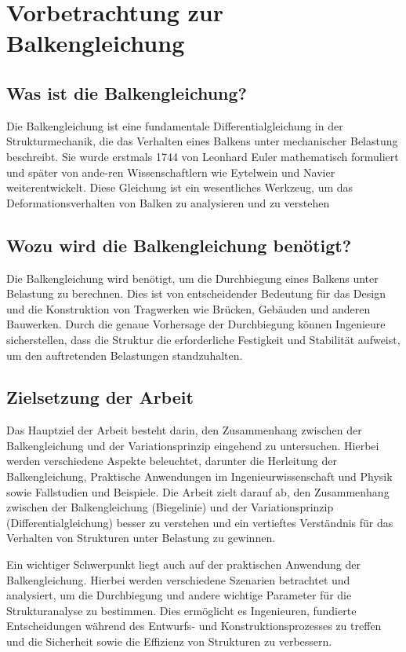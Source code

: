 %
%
%
%
\section{Vorbetrachtung zur Balkengleichung\label{balken:section:teil0}}
\subsection{Was ist die Balkengleichung?}
Die Balkengleichung ist eine fundamentale Differentialgleichung in der Strukturmechanik, die das Verhalten eines Balkens unter mechanischer Belastung beschreibt. 
Sie wurde erstmals 1744 von Leonhard Euler mathematisch formuliert und später von ande-ren Wissenschaftlern wie Eytelwein und Navier weiterentwickelt. 
Diese Gleichung ist ein wesentliches Werkzeug, um das Deformationsverhalten von Balken zu analysieren und zu verstehen
\subsection{Wozu wird die Balkengleichung benötigt?}
Die Balkengleichung wird benötigt, um die Durchbiegung eines Balkens unter Belastung zu berechnen.
Dies ist von entscheidender Bedeutung für das Design und die Konstruktion von Tragwerken wie Brücken, Gebäuden und anderen Bauwerken. 
Durch die genaue Vorhersage der Durchbiegung können Ingenieure sicherstellen, dass die Struktur die erforderliche Festigkeit und Stabilität aufweist, um den auftretenden Belastungen standzuhalten.
\subsection{Zielsetzung der Arbeit}
Das Hauptziel der Arbeit besteht darin, den Zusammenhang zwischen der Balkengleichung und der Variationsprinzip eingehend zu untersuchen.
Hierbei werden verschiedene Aspekte beleuchtet, darunter die Herleitung der Balkengleichung, Praktische Anwendungen im Ingenieurwissenschaft und Physik sowie Fallstudien und Beispiele.
Die Arbeit zielt darauf ab, den Zusammenhang zwischen der Balkengleichung (Biegelinie) und der Variationsprinzip (Differentialgleichung) besser zu verstehen und ein vertieftes Verständnis für das Verhalten von Strukturen unter Belastung zu gewinnen.

Ein wichtiger Schwerpunkt liegt auch auf der praktischen Anwendung der Balkengleichung. 
Hierbei werden verschiedene Szenarien betrachtet und analysiert, um die Durchbiegung und andere wichtige Parameter für die Strukturanalyse zu bestimmen.
Dies ermöglicht es Ingenieuren, fundierte Entscheidungen während des Entwurfs- und Konstruktionsprozesses zu treffen und die Sicherheit sowie die Effizienz von Strukturen zu verbessern.

